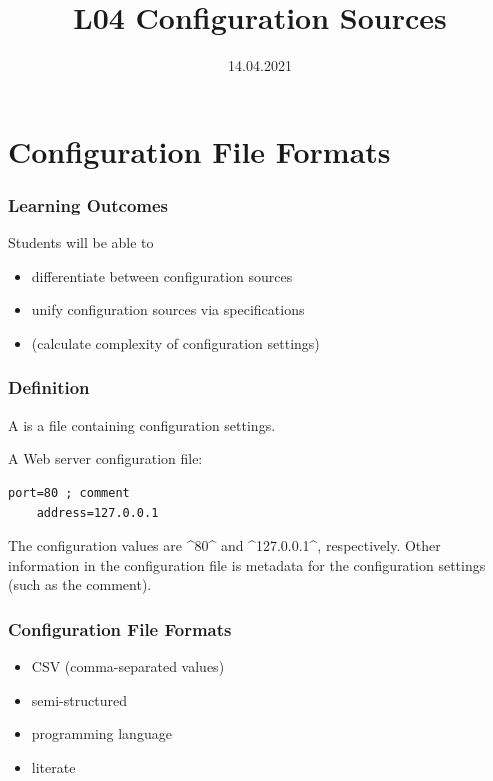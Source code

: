 

\title{L04 Configuration Sources}
\date{14.04.2021}



\section{Configuration File Formats}

\begin{frame}
	\frametitle{Learning Outcomes}
	Students will be able to
	\begin{itemize}
	\item differentiate between configuration sources
	\item unify configuration sources via specifications
	\item (calculate complexity of configuration settings)
	\end{itemize}
\end{frame}

\begin{frame}[fragile]
	\frametitle{Definition}
	A  is a file containing configuration settings.

	\pause
	A Web server configuration file:

	\begin{lstlisting}[gobble=4]
	port=80 ; comment
	address=127.0.0.1\end{lstlisting}

	\pause

	The configuration values are ^80^ and ^127.0.0.1^, respectively.
	Other information in the configuration file is metadata for the configuration settings (such as the comment).
\end{frame}

\begin{frame}
	\frametitle{Configuration File Formats}
	\begin{itemize}
	\item CSV (comma-separated values)
	\item semi-structured
	\item programming language
	\item literate
	\end{itemize}
\end{frame}

